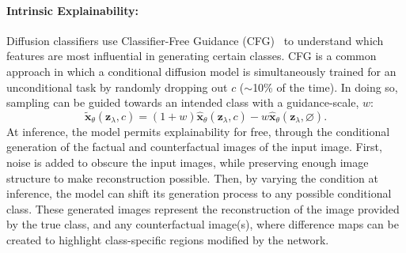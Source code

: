 \paragraph{Intrinsic Explainability:} \label{explainability}
Diffusion classifiers use Classifier-Free Guidance (CFG)~\cite{ho2022classifierfreediffusionguidance} to understand which features are most influential in generating certain classes. CFG is a common approach in which a conditional diffusion model is simultaneously trained for an unconditional task by randomly dropping out $c$ ($\sim$10\% of the time). In doing so, sampling can be guided towards an intended class with a guidance-scale, $w$:
\begin{equation}
    \tilde{\bm{x}}_\theta(\bm{z}_\lambda, c) = (1+w)\hat{\bm{x}}_\theta(\bm{z}_\lambda, c) - w\hat{\bm{x}}_\theta(\bm{z}_\lambda, \varnothing).
\end{equation}
At inference, the model permits explainability for free, 
through the conditional generation of the factual and counterfactual images of the input image. First, noise is added to obscure the input images, while preserving enough image structure to make reconstruction possible. Then, by varying the condition at inference, the model can shift its generation process to any possible conditional class. These generated images represent the reconstruction of the image provided by the true class, and any counterfactual image(s), where difference maps can be created to highlight class-specific regions modified by the network. %

